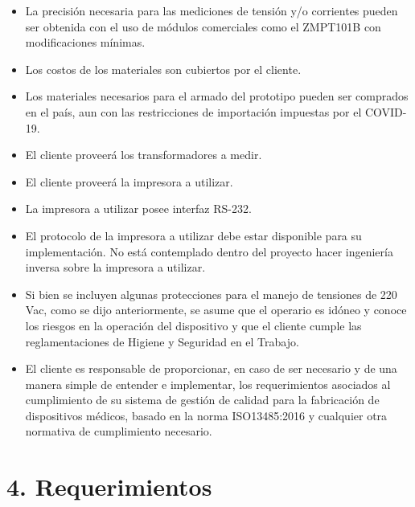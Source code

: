 \documentclass[11pt]{charter}
\begin{document}
\begin{itemize}
\item La precisión necesaria para las mediciones de tensión y/o corrientes pueden ser obtenida con el uso de módulos comerciales como el ZMPT101B con modificaciones mínimas.
\item Los costos de los materiales son cubiertos por el cliente.
\item Los materiales necesarios para el armado del prototipo pueden ser comprados en el país, aun con las restricciones de importación impuestas por el COVID-19.
\item El cliente proveerá los transformadores a medir.
\item El cliente proveerá la impresora a utilizar.
\item La impresora a utilizar posee interfaz RS-232.
\item El protocolo de la impresora a utilizar debe estar disponible para su implementación. No está contemplado dentro del proyecto hacer ingeniería inversa sobre la impresora a utilizar.
\item Si bien se incluyen algunas protecciones para el manejo de tensiones de 220 Vac, como se dijo anteriormente, se asume que el operario es idóneo y conoce los riesgos en la operación del dispositivo y que el cliente cumple las reglamentaciones de Higiene y Seguridad en el Trabajo.
\item El cliente es responsable de proporcionar, en caso de ser necesario y de una manera simple de entender e implementar, los requerimientos asociados al cumplimiento de su sistema de gestión de calidad para la fabricación de dispositivos médicos, basado en la norma ISO13485:2016 y cualquier otra normativa de cumplimiento necesario.
\end{itemize}



\section{4. Requerimientos}
\label{sec:requerimientos}
\end{document}
